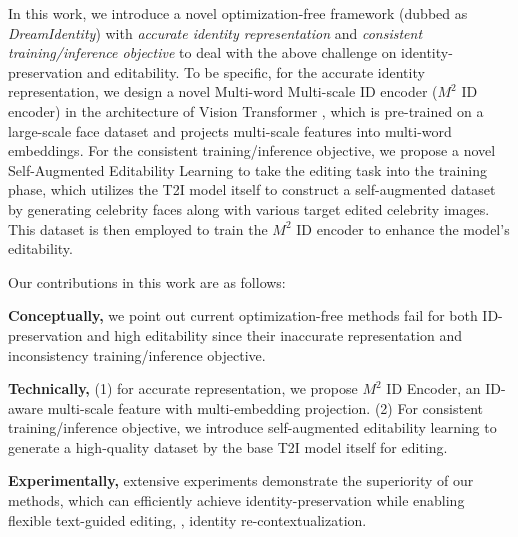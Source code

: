 In this work, we introduce a novel optimization-free framework (dubbed as \emph{DreamIdentity}) with \emph{accurate identity representation} and \emph{consistent training/inference objective} to deal with the above challenge on identity-preservation and editability. To be specific, for the accurate identity representation,  we design a novel  Multi-word Multi-scale  ID encoder ($M^2$ ID encoder) in the architecture of Vision Transformer \cite{dosovitskiy2020image}, which is pre-trained on a large-scale face dataset and projects multi-scale features into multi-word embeddings.
For the consistent training/inference objective, we propose a novel Self-Augmented Editability Learning to take the editing task into the training phase, which utilizes the T2I model itself to construct a self-augmented dataset by generating  celebrity faces along with various target edited celebrity images. This dataset is then employed to train the $M^2$ ID encoder to enhance the model's editability.


Our contributions in this work are as follows:

\textbf{Conceptually,} we point out current optimization-free methods fail for both ID-preservation and high editability   since their inaccurate representation and inconsistency training/inference objective.

\textbf{Technically,} (1) for accurate representation, we propose $M^2$ ID Encoder, an ID-aware multi-scale feature with multi-embedding projection. (2) For consistent training/inference objective, we introduce self-augmented editability learning to generate a high-quality dataset by the base T2I model itself for editing.

\textbf{Experimentally,} extensive experiments demonstrate the superiority of our methods, which can efficiently achieve identity-preservation while enabling flexible text-guided editing, 
\ie, identity re-contextualization.


